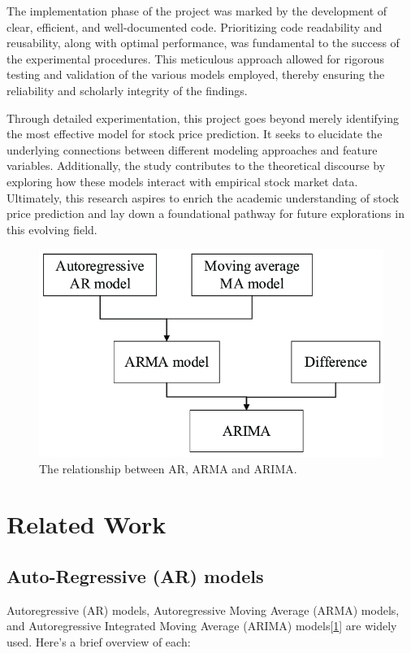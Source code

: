 \documentclass[10pt,twocolumn,letterpaper]{article}
\begin{document}
The implementation phase of the project was marked by the development of clear, efficient, and well-documented code.
Prioritizing code readability and reusability, along with optimal performance, was fundamental to the success of the experimental procedures.
This meticulous approach allowed for rigorous testing and validation of the various models employed, thereby ensuring the reliability and scholarly integrity of the findings.

Through detailed experimentation, this project goes beyond merely identifying the most effective model for stock price prediction.
It seeks to elucidate the underlying connections between different modeling approaches and feature variables.
Additionally, the study contributes to the theoretical discourse by exploring how these models interact with empirical stock market data.
Ultimately, this research aspires to enrich the academic understanding of stock price prediction and lay down a foundational pathway for future explorations in this evolving field.

\begin{figure}[h]
	\centering
	\includegraphics[width=\columnwidth]{arma_arima}
	\caption{The relationship between AR, ARMA and ARIMA.}
	\label{fig:arma_arima}
\end{figure}
\section{Related Work}
\label{sec:related}
\subsection{Auto-Regressive (AR) models}
Autoregressive (AR) models, Autoregressive Moving Average (ARMA) models, and Autoregressive Integrated Moving Average (ARIMA) models\cite{valipour2013comparison, shah2019stock, agrawal2013state}[\ref{fig:arma_arima}] are widely used. Here's a brief overview of each:
\end{document}
